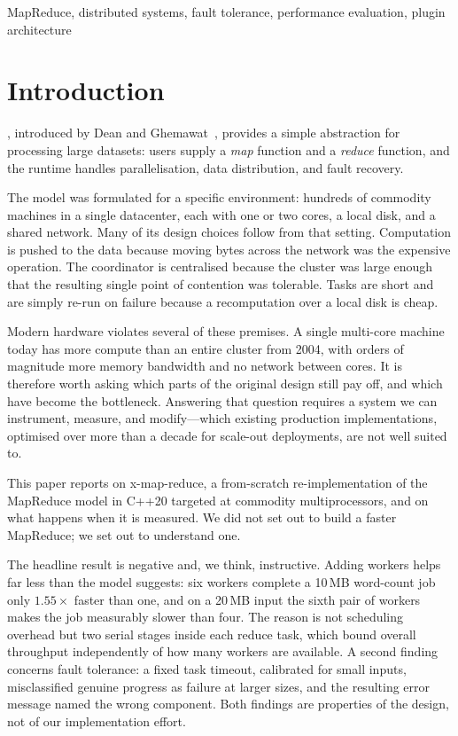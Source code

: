 \documentclass[conference]{IEEEtran}
\begin{document}
\begin{IEEEkeywords}
MapReduce, distributed systems, fault tolerance, performance evaluation,
plugin architecture
\end{IEEEkeywords}

\section{Introduction}
, introduced by Dean and Ghemawat~\cite{dean2004mapreduce},
provides a simple abstraction for processing large datasets: users supply a
\textit{map} function and a \textit{reduce} function, and the runtime handles
parallelisation, data distribution, and fault recovery.

The model was formulated for a specific environment: hundreds of commodity
machines in a single datacenter, each with one or two cores, a local disk,
and a shared network. Many of its design choices follow from that setting.
Computation is pushed to the data because moving bytes across the network
was the expensive operation. The coordinator is centralised because the
cluster was large enough that the resulting single point of contention was
tolerable. Tasks are short and are simply re-run on failure because a
recomputation over a local disk is cheap.

Modern hardware violates several of these premises. A single multi-core
machine today has more compute than an entire cluster from 2004, with
orders of magnitude more memory bandwidth and no network between cores.
It is therefore worth asking which parts of the original design still
pay off, and which have become the bottleneck. Answering that question
requires a system we can instrument, measure, and modify---which existing
production implementations, optimised over more than a decade for
scale-out deployments, are not well suited to.

This paper reports on x-map-reduce, a from-scratch re-implementation of
the MapReduce model in C++20 targeted at commodity multiprocessors, and on
what happens when it is measured. We did not set out to build a faster
MapReduce; we set out to understand one.

The headline result is negative and, we think, instructive. Adding workers
helps far less than the model suggests: six workers complete a 10\,MB
word-count job only $1.55\times$ faster than one, and on a 20\,MB input the
sixth pair of workers makes the job measurably slower than four. The reason
is not scheduling overhead but two serial stages inside each reduce task,
which bound overall throughput independently of how many workers are
available.
A second finding concerns fault tolerance: a fixed task timeout, calibrated
for small inputs, misclassified genuine progress as failure at larger
sizes, and the resulting error message named the wrong component. Both
findings are properties of the design, not of our implementation effort.
\end{document}
